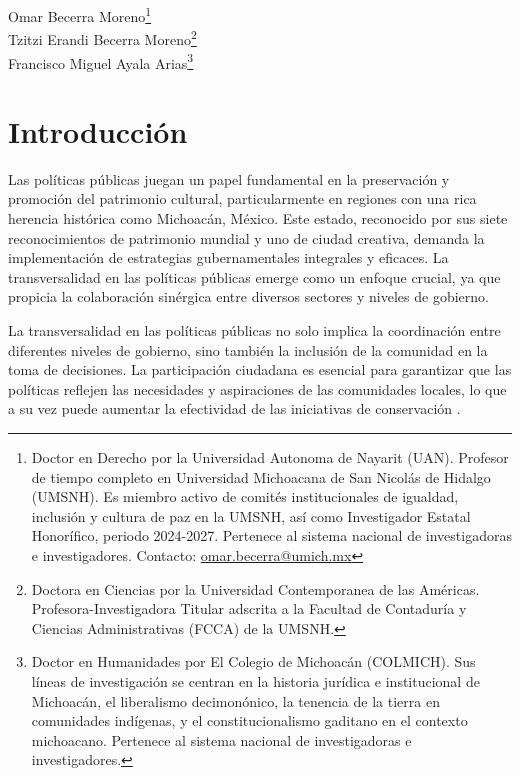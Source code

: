 \documentclass[
  spanish,
  11pt,
  a4paper,
]{scrbook}
\begin{document}
\begin{flushright}
\Large Omar Becerra Moreno\footnote{Doctor en Derecho por la Universidad Autonoma de Nayarit (UAN). Profesor de tiempo completo en  Universidad Michoacana de San Nicolás de Hidalgo (UMSNH). Es miembro activo de comités institucionales de igualdad, inclusión y cultura de paz en la UMSNH, así como Investigador Estatal Honorífico, periodo 2024-2027. Pertenece al sistema nacional de investigadoras e investigadores. Contacto: \href{omar.becerra@umich.mx}{omar.becerra@umich.mx}} \\ Tzitzi Erandi Becerra Moreno\footnote{Doctora en Ciencias por la Universidad Contemporanea de las Américas. Profesora-Investigadora Titular adscrita a la Facultad de Contaduría y Ciencias Administrativas (FCCA) de la UMSNH.} \\ Francisco Miguel Ayala Arias\footnote{Doctor en Humanidades por El Colegio de Michoacán (COLMICH). Sus líneas de investigación se centran en la historia jurídica e institucional de Michoacán, el liberalismo decimonónico, la tenencia de la tierra en comunidades indígenas, y el constitucionalismo gaditano en el contexto michoacano. Pertenece al sistema nacional de investigadoras e investigadores.}
\end{flushright}

\section*{Introducción}\label{introducciuxf3n-2}


Las políticas públicas juegan un papel fundamental en la preservación y
promoción del patrimonio cultural, particularmente en regiones con una
rica herencia histórica como Michoacán, México. Este estado, reconocido
por sus siete reconocimientos de patrimonio mundial y uno de ciudad
creativa, demanda la implementación de estrategias gubernamentales
integrales y eficaces. La transversalidad en las políticas públicas
emerge como un enfoque crucial, ya que propicia la colaboración
sinérgica entre diversos sectores y niveles de gobierno.

La transversalidad en las políticas públicas no solo implica la
coordinación entre diferentes niveles de gobierno, sino también la
inclusión de la comunidad en la toma de decisiones. La participación
ciudadana es esencial para garantizar que las políticas reflejen las
necesidades y aspiraciones de las comunidades locales, lo que a su vez
puede aumentar la efectividad de las iniciativas de conservación
\autocite{TorresMuseo2024}.
\end{document}
